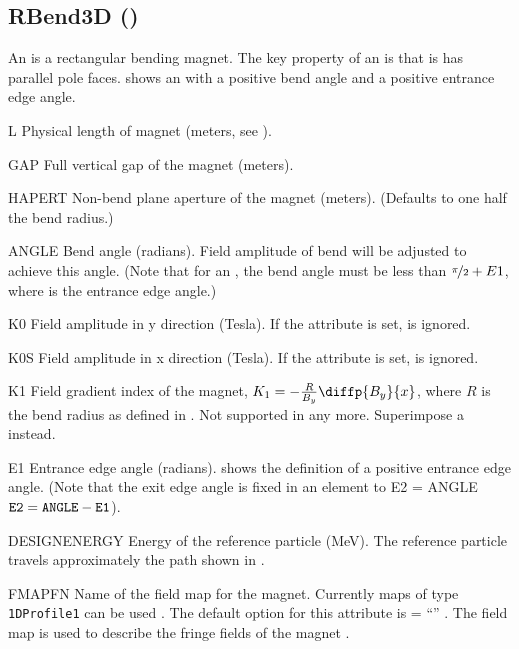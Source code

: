 \clearpage
\subsection{RBend3D (\opalt)}
\label{ssec:RBend3D}
An  is a rectangular bending magnet. The key property of an  is that is has parallel
pole faces.  shows an  with a positive bend angle and a positive entrance edge angle.

\begin{kdescription}
\item[L]
  Physical length of magnet (meters, see ).

\item[GAP]
  Full vertical gap of the magnet (meters).

\item[HAPERT]
  Non-bend plane aperture of the magnet (meters). (Defaults to one half the bend radius.)

\item[ANGLE]
  Bend angle (radians). Field amplitude of bend will be adjusted to achieve this angle. (Note that for
  an , the bend angle must be less than $\nicefrac{\pi}{2} + E1$, where  is the entrance edge angle.)

\item[K0]
  Field amplitude in y direction (Tesla). If the  attribute is set,  is ignored.

\item[K0S]
  Field amplitude in x direction (Tesla). If the  attribute is set,  is ignored.

\item[K1]
  Field gradient index of the magnet, $K_1=-\frac{R}{B_{y}}\diffp{B_y}{x}$, where
  $R$ is the bend radius as defined in . Not supported in \noopalt any more. Superimpose a  instead.

\item[E1]
  Entrance edge angle (radians).  shows the definition of a positive entrance
  edge angle. (Note that the exit edge angle is fixed in an  element to E2 = ANGLE
  $\text{\keyword{E2}} = \text{\keyword{ANGLE}} - \text{\keyword{E1}}$).

\item[DESIGNENERGY]
  Energy of the reference particle (\si{\mega\electronvolt}). The reference particle travels approximately the path shown in
  .

\item[FMAPFN]
  Name of the field map for the magnet. Currently maps of type \texttt{1DProfile1} can
  be used . The default option for this attribute is  =
  ``'' . The field map is used to
  describe the fringe fields of the magnet .

\end{kdescription}
\clearpage

